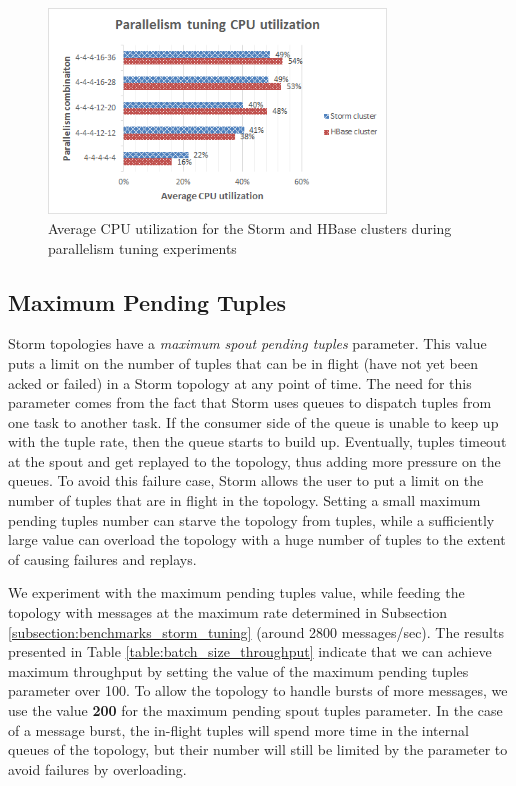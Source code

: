 \begin{figure}[h!]
\centering
\includegraphics[width=0.8\textwidth]{figures/benchmarks_storm_tuning_cpu}
\caption{Average CPU utilization for the Storm and HBase clusters during parallelism tuning experiments}
\label{figure:benchmarks_storm_tuning_cpu}
\end{figure}

\subsection{Maximum Pending Tuples}

Storm topologies have a \emph{maximum spout pending tuples} parameter. This value puts a limit on the number of tuples that can be in flight (have not yet been acked or failed) in a Storm topology at any point of time. The need for this parameter comes from the fact that Storm uses queues to dispatch tuples from one task to another task. If the consumer side of the queue is unable to keep up with the tuple rate, then the queue starts to build up. Eventually, tuples timeout at the spout and get replayed to the topology, thus adding more pressure on the queues. To avoid this failure case, Storm allows the user to put a limit on the number of tuples that are in flight in the topology. Setting a small maximum pending tuples number can starve the topology from tuples, while a sufficiently large value can overload the topology with a huge number of tuples to the extent of causing failures and replays. 

We experiment with the maximum pending tuples value, while feeding the topology with messages at the maximum rate determined in Subsection \ref{subsection:benchmarks_storm_tuning} (around 2800 messages/sec). The results presented in Table \ref{table:batch_size_throughput} indicate that we can achieve maximum throughput by setting the value of the maximum pending tuples parameter over 100. To allow the topology to handle bursts of more messages, we use the value \textbf{200} for the maximum pending spout tuples parameter. In the case of a message burst, the in-flight tuples will spend more time in the internal queues of the topology, but their number will still be limited by the parameter to avoid failures by overloading.

